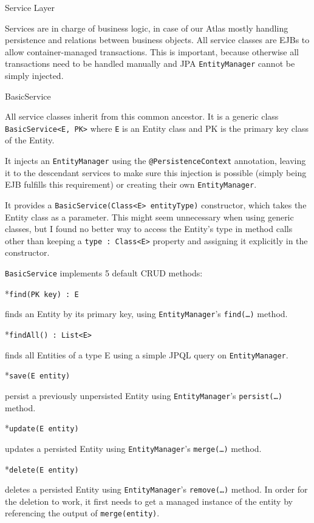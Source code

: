 \sec Service Layer

Services are in charge of business logic, in case of our Atlas mostly handling persistence and relations between business objects. All service classes are EJBs to allow container-managed transactions. This is important, because otherwise all transactions need to be handled manually and JPA {\tt EntityManager} cannot be simply injected.

\secc BasicService

All service classes inherit from this common ancestor. It is a generic class {\tt BasicService<E, PK>} where {\tt E} is an Entity class and PK is the primary key class of the Entity.

It injects an {\tt EntityManager} using the {\tt @PersistenceContext} annotation, leaving it to the descendant services to make sure this injection is possible (simply being EJB fulfills this requirement) or creating their own {\tt EntityManager}.

It provides a {\tt BasicService(Class<E> entityType)} constructor, which takes the Entity class as a parameter. This might seem unnecessary when using generic classes, but I found no better way to access the Entity’s type in method calls other than keeping a {\tt type : Class<E>} property and assigning it explicitly in the constructor.

{\tt BasicService} implements 5 default CRUD methods:

\begitems

*{\tt find(PK key) : E}

finds an Entity by its primary key, using {\tt EntityManager}’s {\tt find(…)} method.

*{\tt findAll() : List<E>}

finds all Entities of a type {E} using a simple JPQL query on {\tt EntityManager}.

*{\tt save(E entity)}

persist a previously unpersisted Entity using {\tt EntityManager}’s {\tt persist(…)} method.

*{\tt update(E entity)}

updates a persisted Entity using {\tt EntityManager}’s {\tt merge(…)} method.

*{\tt delete(E entity)}

deletes a persisted Entity using {\tt EntityManager}’s {\tt remove(…)} method. In order for the deletion to work, it first needs to get a managed instance of the entity by referencing the output of {\tt merge(entity)}.

